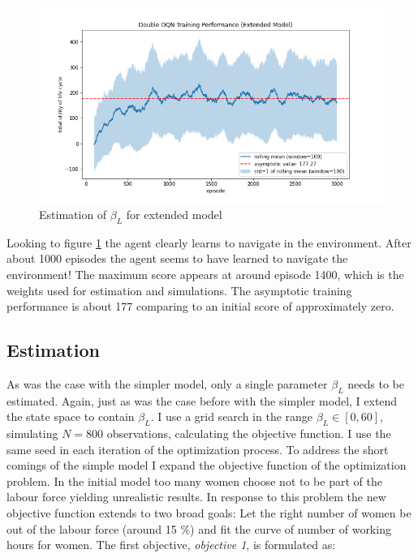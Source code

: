 \begin{figure}[ht]
    \centering
    \includegraphics[scale=0.4]{figures/ddqn_extended_model_training_performance.png}
    \caption{Estimation of $\beta_L$ for extended model}
    \label{fig:training_extended}
\end{figure}

Looking to figure \ref{fig:training_extended} the agent clearly learns to navigate in the environment. After about 1000 episodes the agent seems to have learned to navigate the environment! The maximum score appears at around episode 1400, which is the weights used for estimation and simulations. The asymptotic training performance is about 177 comparing to an initial score of approximately zero.

\subsection{Estimation}

As was the case with the simpler model, only a single parameter $\beta_L$ needs to be estimated. Again, just as was the case before with the simpler model, I extend the state space to contain $\beta_L$. I use a grid search in the range $\beta_L \in [0, 60]$, simulating $N=800$ observations, calculating the objective function. I use the same seed in each iteration of the optimization process. To address the short comings of the simple model I expand the objective function of the optimization problem. In the initial model too many women choose not to be part of the labour force yielding unrealistic results. In response to this problem the new objective function extends to two broad goals: Let the right number of women be out of the labour force (around 15 \%) and fit the curve of number of working hours for women. The first objective, \textit{objective 1}, is formulated as: 

